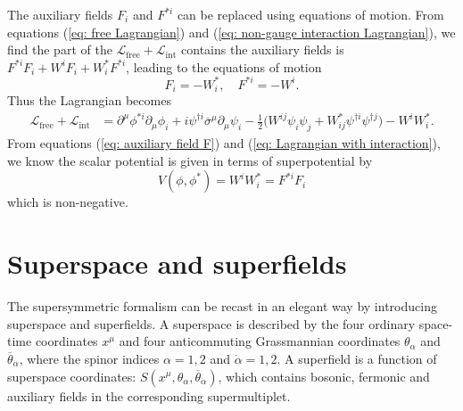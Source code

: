\documentclass[12pt]{report}
\begin{document}
The auxiliary fields $F_{i}$ and $F^{*i}$ can be replaced using equations of motion.
From equations (\ref{eq: free Lagrangian}) and (\ref{eq: non-gauge interaction Lagrangian}), we find the part of the $\mathcal{L}_{\mathrm{free}} + \mathcal{L}_{\mathrm{int}}$ contains the auxiliary fields is $F^{*i} F_{i} + W^{i} F_{i} + W^{*}_{i} F^{*i}$, leading to the equations of motion
\begin{equation} \label{eq: auxiliary field F}
F_{i} = - W^{*}_{i}, \quad 
F^{*i} = - W^{i} .
\end{equation}
Thus the Lagrangian becomes
\begin{align} \label{eq: Lagrangian with interaction}
\mathcal{L}_{\mathrm{free}} + \mathcal{L}_{\mathrm{int}} 
&= \partial^{\mu} \phi^{*i} \partial_{\mu} \phi_{i} + i \psi^{\dag i} \overline{\sigma}^{\mu} \partial_{\mu} \psi_{i} -\frac{1}{2} \Big( W^{ij} \psi_{i} \psi_{j} + W^{*}_{ij} \psi^{\dag i} \psi^{\dag j} \Big) - W^{i} W^{*}_{i} .
\end{align}
From equations (\ref{eq: auxiliary field F}) and (\ref{eq: Lagrangian with interaction}), we know the scalar potential is given in terms of superpotential by
\begin{equation}
V(\phi, \phi^{*}) = W^{i}W^{*}_{i} = F^{*i} F_{i}
\end{equation}
which is non-negative.


\chapter{Superspace and superfields}
The supersymmetric formalism can be recast in an elegant way by introducing superspace and superfields.
A superspace is described by the four ordinary space-time coordinates $x^{\mu}$ and four anticommuting Grassmannian coordinates $\theta_{\alpha}$ and $\overline{\theta}_{\dot{\alpha}}$, where the spinor indices $\alpha = 1, 2$ and $\dot{\alpha} = 1, 2$.
A superfield is a function of superspace coordinates: $S (x^{\mu}, \theta_{\alpha}, \overline{\theta}_{\dot{\alpha}})$, which contains bosonic, fermonic and auxiliary fields in the corresponding supermultiplet.
\end{document}
